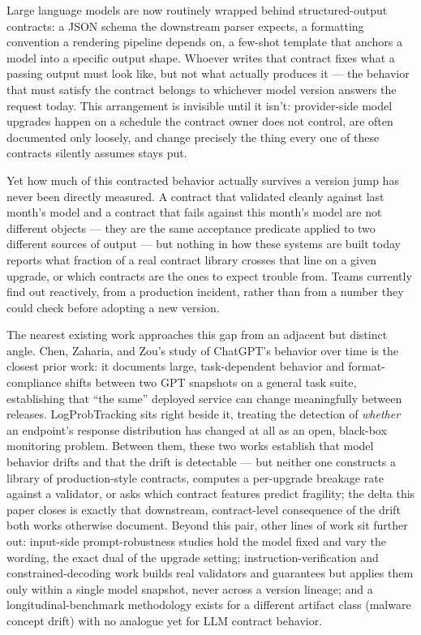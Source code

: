 \documentclass[11pt]{article}
\begin{document}
Large language models are now routinely wrapped behind structured-output contracts: a JSON schema the downstream parser expects, a formatting convention a rendering pipeline depends on, a few-shot template that anchors a model into a specific output shape. Whoever writes that contract fixes what a passing output must look like, but not what actually produces it --- the behavior that must satisfy the contract belongs to whichever model version answers the request today. This arrangement is invisible until it isn't: provider-side model upgrades happen on a schedule the contract owner does not control, are often documented only loosely, and change precisely the thing every one of these contracts silently assumes stays put.

Yet how much of this contracted behavior actually survives a version jump has never been directly measured. A contract that validated cleanly against last month's model and a contract that fails against this month's model are not different objects --- they are the same acceptance predicate applied to two different sources of output --- but nothing in how these systems are built today reports what fraction of a real contract library crosses that line on a given upgrade, or which contracts are the ones to expect trouble from. Teams currently find out reactively, from a production incident, rather than from a number they could check before adopting a new version.

The nearest existing work approaches this gap from an adjacent but distinct angle. Chen, Zaharia, and Zou's study of ChatGPT's behavior over time is the closest prior work: it documents large, task-dependent behavior and format-compliance shifts between two GPT snapshots on a general task suite, establishing that ``the same'' deployed service can change meaningfully between releases. LogProbTracking sits right beside it, treating the detection of \emph{whether} an endpoint's response distribution has changed at all as an open, black-box monitoring problem. Between them, these two works establish that model behavior drifts and that the drift is detectable --- but neither one constructs a library of production-style contracts, computes a per-upgrade breakage rate against a validator, or asks which contract features predict fragility; the delta this paper closes is exactly that downstream, contract-level consequence of the drift both works otherwise document. Beyond this pair, other lines of work sit further out: input-side prompt-robustness studies hold the model fixed and vary the wording, the exact dual of the upgrade setting; instruction-verification and constrained-decoding work builds real validators and guarantees but applies them only within a single model snapshot, never across a version lineage; and a longitudinal-benchmark methodology exists for a different artifact class (malware concept drift) with no analogue yet for LLM contract behavior.
\end{document}
